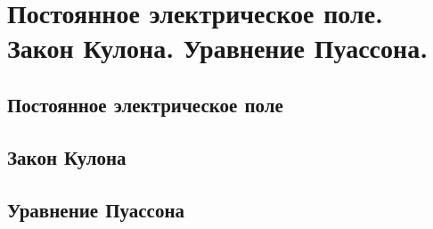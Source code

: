 \chapter{Постоянное электрическое поле. Закон Кулона. Уравнение 
Пуассона.}

\section{Постоянное электрическое поле}
\section{Закон Кулона}
\section{Уравнение Пуассона}
